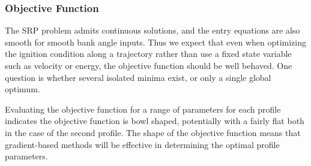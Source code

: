 \documentclass[]{article}
\begin{document}
\subsubsection{Objective Function}
The SRP problem admits continuous solutions, and the entry equations are also smooth for smooth bank angle inputs. Thus we expect that even when optimizing the ignition condition along a trajectory rather than use a fixed state variable such as velocity or energy, the objective function should be well behaved. One question is whether several isolated minima exist, or only a single global optimum. 

Evaluating the objective function for a range of parameters for each profile indicates the objective function is bowl shaped, potentially with a fairly flat both in the case of the second profile. The shape of the objective function means that gradient-based methods will be effective in determining the optimal profile parameters. 
\end{document}
